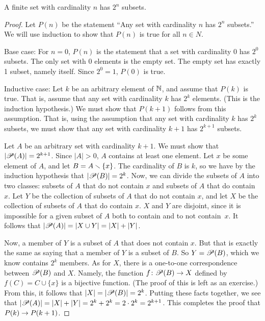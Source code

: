 \begin{theorem}\label{T-subsetct}
A finite set with cardinality $n$  has $2^n$ subsets.
\end{theorem}
\begin{proof}
Let $P(n)$ be the statement ``Any set with cardinality $n$ has $2^n$
subsets.''  We will use induction to show that $P(n)$ is true
for all $n\in N$.

Base case:  For $n=0$, $P(n)$ is the statement that a set with
cardinality 0 has $2^0$ subsets.  The only set with 0 elements is
the empty set.  The empty set has exactly 1 subset, namely itself.
Since $2^0=1$, $P(0)$ is true.

Inductive case:  Let $k$ be an arbitrary element of ${\mathbb N}$, and
assume that $P(k)$ is true.  That is, assume that any set with
cardinality $k$ has $2^k$ elements.  (This is the induction
hypothesis.)  We must show that $P(k+1)$
follows from this assumption.  That is, using the assumption
that any set with cardinality $k$ has $2^k$ subsets, we must show that any
set with cardinality $k+1$ has $2^{k+1}$ subsets.

Let $A$ be an arbitrary set with cardinality $k+1$. 
We must show that $|{\mathscr P}(A)|=2^{k+1}$.   Since $|A|>0$,
$A$ contains at least one element.  Let $x$ be
some element of $A$, and let $B=A\smallsetminus\{x\}$.  The cardinality of
$B$ is $k$, so we have by the induction hypothesis that $|{\mathscr P}(B)|=2^k$.
Now, we can divide the subsets of $A$ into two classes: subsets of
$A$ that do not contain $x$ and subsets of $A$ that do contain $x$.
Let $Y$ be the collection of subsets of $A$ that do not contain $x$,
and let $X$ be the collection of subsets of $A$ that do contain $x$.
$X$ and $Y$ are disjoint, since it is impossible for a given subset
of $A$ both to contain and to not contain~$x$. It follows that
$|{\mathscr P}(A)|=|X\cup Y|=|X|+|Y|$.

Now, a member of $Y$ is a subset of $A$ that does not contain $x$.
But that is exactly the same as saying that a member of $Y$ is
a subset of $B$. So $Y={\mathscr P}(B)$, which we know contains $2^k$ members.
As for $X$, there is a one-to-one correspondence between ${\mathscr P}(B)$
and $X$.  Namely, the function $f\colon{\mathscr P}(B)\to X$ defined by
$f(C)=C\cup \{x\}$ is a bijective function.  (The proof of this
is left as an exercise.)  From this, it follows that
$|X|=|{\mathscr P}(B)|=2^k$.  Putting these facts together, we see that
$|{\mathscr P}(A)|=|X|+|Y|=2^k+2^k=2\cdot2^k=2^{k+1}$.  This completes the
proof that $P(k)\rightarrow P(k+1)$.
\end{proof}

